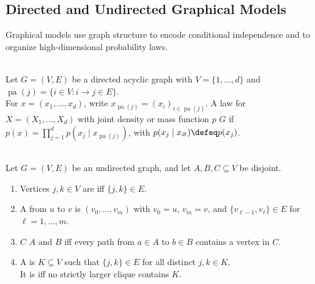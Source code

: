 \subsection{Directed and Undirected Graphical Models}

Graphical models use graph structure to encode conditional independence and to organize high-dimensional probability laws.

\begin{definition} \label{def:sl-directed-graphical-model} \\
Let $G=(V,E)$ be a directed acyclic graph with $V=\{1,\ldots,d\}$ and $\operatorname{pa}(j)=\{i\in V:i\to j\in E\}$.\\
For $x=(x_1,\ldots,x_d)$, write $x_{\operatorname{pa}(j)}=(x_i)_{i\in\operatorname{pa}(j)}$. A law for $X=(X_1,\ldots,X_d)$ with joint density or mass function $p$  $G$ if $p(x)=\prod\limits_{j=1}^d p(x_j\mid x_{\operatorname{pa}(j)})$, with $p(x_j\mid x_\varnothing)\defeq p(x_j)$.
\end{definition}

\begin{definition} \label{def:sl-undirected-markov-vocabulary} \\
Let $G=(V,E)$ be an undirected graph, and let $A,B,C\subseteq V$ be disjoint.
\begin{enumerate}[label=(\roman*)]
\setlength{\itemsep}{0pt}
\item Vertices $j,k\in V$ are  iff $\{j,k\}\in E$.
\item A  from $u$ to $v$ is $(v_0,\ldots,v_m)$ with $v_0=u$, $v_m=v$, and $\{v_{\ell-1},v_\ell\}\in E$ for $\ell=1,\ldots,m$.
\item $C$  $A$ and $B$ iff every path from $a\in A$ to $b\in B$ contains a vertex in $C$.
\item A  is $K\subseteq V$ such that $\{j,k\}\in E$ for all distinct $j,k\in K$.\\
It is  iff no strictly larger clique contains $K$.
\end{enumerate}
\end{definition}

